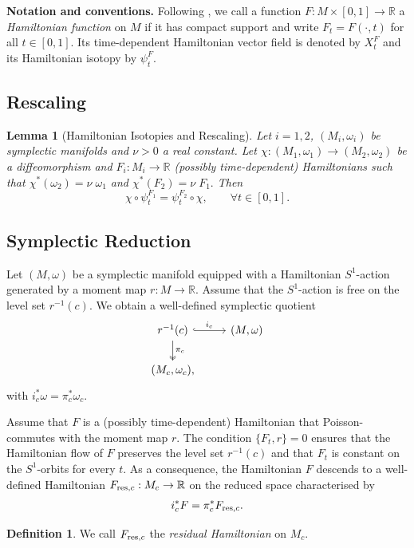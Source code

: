\documentclass[10pt,oneside,reqno]{amsart}
\newtheorem{lemma}[theorem]{Lemma}
\theoremstyle{definition}
\newtheorem{definition}[theorem]{Definition}
\newcommand{\IR}{\mathbb{R}}
\newcommand{\resc}{{\textup{res},c}}
\begin{document}
\medskip

\noindent\textbf{Notation and conventions.} Following \cite{polterovich2012geometry}, we call a function $F:M\times [0,1]\to \IR$ a \emph{Hamiltonian function} on $M$ if it has compact support and write $F_t = F(\cdot, t)$ for all $t\in [0,1].$ Its time-dependent Hamiltonian vector field is denoted by $X^F_t$ and its Hamiltonian isotopy by $\psi^F_t.$ 

\subsection{Rescaling}
\begin{lemma}[Hamiltonian Isotopies and Rescaling] \label{lem:rescalediffeo}
    Let $i=1,2$, $(M_i,\omega_i)$ be symplectic manifolds and $\nu >0$ a real constant. Let $\chi:(M_1,\omega_1) \to (M_2,\omega_2)$ be a diffeomorphism and $F_i:M_i\to \IR$ (possibly time-dependent) Hamiltonians such that $\chi^*(\omega_2) = \nu\;\omega_1 $ and $\chi^*(F_2)=\nu\;F_1.$ Then
    \begin{equation*}
        \chi \circ \psi_t^{F_1} = \psi_t^{F_2} \circ \chi, \qquad \forall t\in [0,1].
    \end{equation*}
\end{lemma}


\subsection{Symplectic Reduction}\label{sec:isotopiesandreduction}
Let $(M,\omega)$ be a symplectic manifold equipped with a Hamiltonian $S^1$-action generated by a moment map $r:M\to \IR.$ Assume that the $S^1$-action is free on the level set $r^{-1}(c)$. We obtain a well-defined symplectic quotient
\begin{equation*}
    \begin{tikzcd}
r^{-1}(c) \arrow[r, "i_c", hook] \arrow[d, "\pi_c", two heads] & {(M,\omega)} \\
{(M_c,\omega_c),}                                                &             
\end{tikzcd}
\end{equation*}
with $i_c^*\omega = \pi_c^*\omega_c.$ 

Assume that $F$ is a (possibly time-dependent) Hamiltonian that Poisson-commutes with the moment map $r$. The condition $\{F_t,r\}=0$ ensures that the Hamiltonian flow of $F$ preserves the level set $r^{-1}(c)$ and that $F_t$ is constant on the $S^1$-orbits for every $t$. As a consequence, the Hamiltonian $F$ descends to a well-defined Hamiltonian $F_\resc:M_c\to \IR$ on the reduced space characterised by 
\begin{equation*}
    i_c^* F = \pi_c^*F_\resc.
\end{equation*}
\begin{definition}
    We call $F_\resc$ the \textit{residual Hamiltonian} on $M_c.$
\end{definition}
\end{document}
